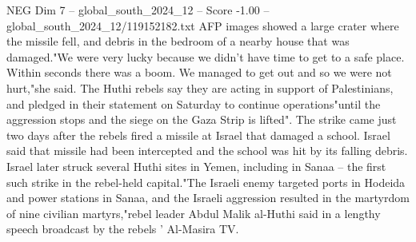 \begin{textsample}{NEG Dim 7 – global\_south\_2024\_12 – Score -1.00 – global\_south\_2024\_12/119152182.txt}
AFP images showed a large crater where the missile fell, and debris in the bedroom of a nearby house that was damaged."We were very lucky because we didn't have time to get to a safe place.
Within seconds there was a boom.
We managed to get out and so we were not hurt,"she said.
The Huthi rebels say they are acting in support of Palestinians, and pledged in their statement on Saturday to continue operations"until the aggression stops and the siege on the Gaza Strip is lifted".
The strike came just two days after the rebels fired a missile at Israel that damaged a school.
Israel said that missile had been intercepted and the school was hit by its falling debris.
Israel later struck several Huthi sites in Yemen, including in Sanaa -- the first such strike in the rebel-held capital."The Israeli enemy targeted ports in Hodeida and power stations in Sanaa, and the Israeli aggression resulted in the martyrdom of nine civilian martyrs,"rebel leader Abdul Malik al-Huthi said in a lengthy speech broadcast by the rebels ' Al-Masira TV.

\end{textsample}
